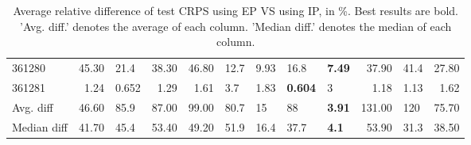 \begin{table}[ht!]
\begin{tabular}{lrlrrllllrlr}
  361280 & 45.30 & 21.4 & 38.30 & 46.80 & 12.7 & 9.93 & 16.8 & \textbf{7.49} & 37.90 & 41.4 & 27.80 \\ 
  361281 & 1.24 & 0.652 & 1.29 & 1.61 & 3.7 & 1.83 & \textbf{0.604} & 3 & 1.18 & 1.13 & 1.62 \\ 
   \hline
Avg. diff & 46.60 & 85.9 & 87.00 & 99.00 & 80.7 & 15 & 88 & \textbf{3.91} & 131.00 & 120 & 75.70 \\ 
  Median diff & 41.70 & 45.4 & 53.40 & 49.20 & 51.9 & 16.4 & 37.7 & \textbf{4.1} & 53.90 & 31.3 & 38.50 \\ 
   \hline
\hline
\end{tabular}
\endgroup
\caption{Average relative difference of test CRPS using EP VS using IP, in \%. 
                  Best results are bold. 
                  'Avg. diff.' denotes the average of each column.
                  'Median diff.' denotes the median of each column.} 
\label{TABLES/table_results_CRPS_spatial_depth_only_num_EP_VS_IP}
\end{table}
